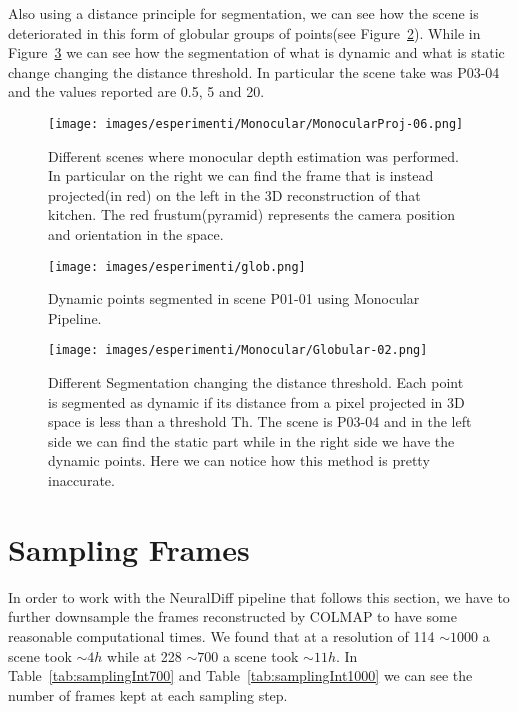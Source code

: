 Also using a distance principle for segmentation, we can see how the scene is deteriorated in this form of globular groups of points(see Figure~\ref{fig:glob}).
While in Figure~\ref{fig:glob2} we can see how the segmentation of what is dynamic and what is static change changing the distance threshold. In particular the 
scene take was P03-04 and the values reported are 0.5, 5 and 20.

\begin{figure}[H]
    \centering
    \texttt{[image: images/esperimenti/Monocular/MonocularProj-06.png]} 
    \caption{Different scenes where monocular depth estimation was performed. In particular on 
    the right we can find the frame that is instead projected(in red) on the left in the 3D reconstruction of that kitchen.
    The red frustum(pyramid) represents the camera position and orientation in the space.}\label{fig:Monoc}
\end{figure}
\begin{figure}[t]
    \centering
    \texttt{[image: images/esperimenti/glob.png]} 
    \caption{Dynamic points segmented in scene P01-01 using Monocular Pipeline.}\label{fig:glob}
\end{figure}
\begin{figure}[H]
    \centering
    \texttt{[image: images/esperimenti/Monocular/Globular-02.png]} 
    \caption{Different Segmentation changing the distance threshold. Each point is segmented as dynamic if its distance from a pixel 
    projected in 3D space is less than a threshold Th. The scene is P03-04 and in the 
    left side we can find the static part while in the right side we have the dynamic points. Here we can notice 
    how this method is pretty inaccurate.}\label{fig:glob2}
\end{figure}

\section{Sampling Frames}
In order to work with the NeuralDiff pipeline that follows this section, we have to further downsample the frames reconstructed by COLMAP
to have some reasonable computational times. We found that at a resolution of 114 $\sim1000$ a scene took  $\sim4h$ while at 228 $\sim700$ 
a scene took  $\sim11h$. In Table~\ref{tab:samplingInt700} and Table~\ref{tab:samplingInt1000} we can see the number of frames kept at each sampling step.




